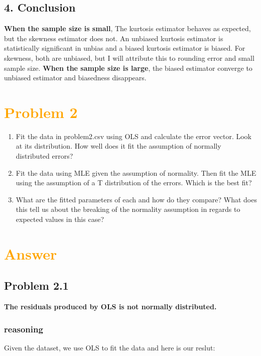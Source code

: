 \documentclass[11pt,en]{elegantpaper}
\begin{document}
\subsection*{4. Conclusion}

\textbf{When the sample size is small}, The kurtosis estimator behaves as expected, but the skewness estimator does not. 
An unbiased kurtosis estimator is statistically significant in unbias and a biased kurtosis estimator is biased. 
For skewness, both are unbiased, but I will attribute this to rounding error and small sample size.
\textbf{When the sample size is large}, the biased estimator converge to unbiased estimator and biasedness disappears.



\section*{\textcolor{orange}{Problem 2}}
\begin{enumerate}
    \item Fit the data in problem2.csv using OLS and calculate the error vector. Look at its distribution. 
    How well does it fit the assumption of normally distributed errors?
    \item Fit the data using MLE given the assumption of normality. 
    Then fit the MLE using the assumption of a T distribution of the errors. Which is the best fit?
    \item What are the fitted parameters of each and how do they compare? 
    What does this tell us about the breaking of the normality assumption in regards to expected values in this case?
\end{enumerate}

\section*{\textcolor{orange}{Answer}}

\subsection*{Problem 2.1}

\textbf{The residuals produced by OLS is not normally distributed.}

\subsubsection*{reasoning}

Given the dataset, we use OLS to fit the data and here is our reslut:
\end{document}
